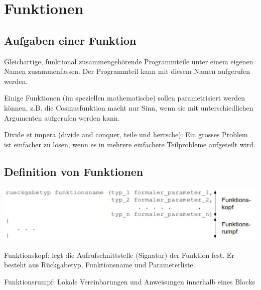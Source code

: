 \section{Funktionen}
	\subsection{Aufgaben einer Funktion}
		\begin{compactitem}
			\item Gleichartige, funktional zusammengehörende Programmteile unter einem eigenen Namen zusammenfassen. Der Programmteil kann mit diesem Namen aufgerufen werden.
			\item Einige Funktionen (im speziellen mathematische) sollen parametrisiert werden können, z.B. die Cosinusfunktion macht nur Sinn, wenn sie mit unterschiedlichen Argumenten aufgerufen werden kann.
			\item Divide et impera (divide and conquer, teile und herrsche): Ein grosses Problem ist einfacher zu lösen, wenn es in mehrere einfachere Teilprobleme aufgeteilt wird.
		\end{compactitem}	
		
	\subsection{Definition von Funktionen }
		\begin{minipage}[c]{10 cm}
			\includegraphics[width=1\textwidth]{pics/funktionen_aufbau.jpg}
		\end{minipage}
		\begin{minipage}[c]{9 cm}
			\begin{compactitem}
				\item Funktionskopf: legt die Aufrufschnittstelle (Signatur) der Funktion fest. Er besteht aus Rückgabetyp, Funktionsname und Parameterliste.
				\item Funktionsrumpf: Lokale Vereinbarungen und Anweisungen innerhalb eines Blocks
			\end{compactitem}	
		\end{minipage}	
			
